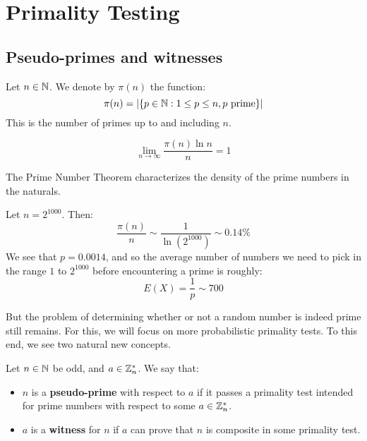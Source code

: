 \documentclass{article}
\begin{document}
\newpage
\section{Primality Testing}
\subsection{Pseudo-primes and witnesses}

\begin{defn}
    Let $ n \in \mathbb{N} $. We denote by $ \pi(n) $ the function:
    \begin{equation*}
        \pi(n) = \abs{\left\{{p \in \mathbb{N}: 1 \leq p \leq n, p \textrm{ prime}}\right\}}
    \end{equation*}
    This is the number of primes up to and including $ n $.
\end{defn}

\begin{thm}[title=Prime Number Theorem]
    \begin{equation*}
        \lim_{n\rightarrow \infty} \frac{\pi(n)\ln n}{n} = 1
    \end{equation*}
\end{thm}

The Prime Number Theorem characterizes the density of the prime numbers in the naturals.

\begin{xmp}[source=Primary Source Material]
    Let $ n = 2^{1000} $. Then:
    \begin{equation*}
        \frac{\pi(n)}{n} \sim \frac{1}{\ln(2^{1000})} \sim 0.14\%
    \end{equation*}
    We see that $ p = 0.0014 $, and so the average number of numbers we need to pick in the range
    $ 1 $ to $ 2^{1000} $ before encountering a prime is roughly:
    \begin{equation*}
        E(X) = \frac{1}{p} \sim 700
    \end{equation*}
\end{xmp}

But the problem of determining whether or not a random number is indeed prime still remains.
For this, we will focus on more probabilistic primality tests.
To this end, we see two natural new concepts.

\begin{defn}
    Let $ n \in \mathbb{N} $ be odd, and $ a \in \mathbb{Z}^{*}_{n} $.
    We say that:
    \begin{itemize}
        \item $ n $ is a \textbf{pseudo-prime} with respect to $ a $ if it
            passes a primality test intended for prime numbers with respect to some
            $ a \in \mathbb{Z}_{n}^{*} $.
        \item $ a $ is a \textbf{witness} for $ n $ if $ a $ can prove that $ n $ is composite
            in some primality test.
    \end{itemize}
\end{defn}
\end{document}
